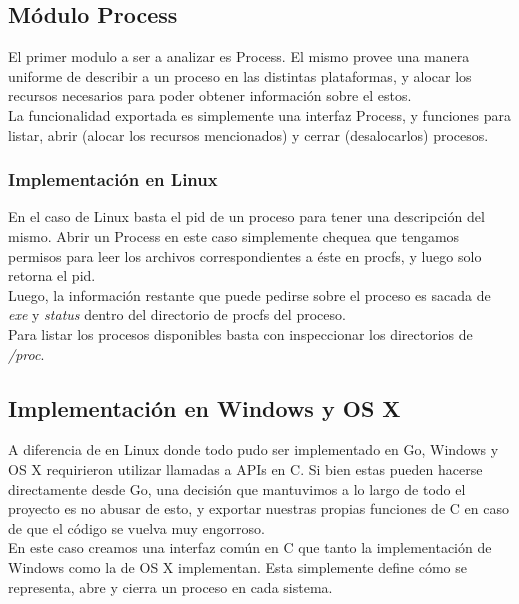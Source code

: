 \subsection{Módulo Process}

El primer modulo a ser a analizar es Process. El mismo provee una manera
uniforme de describir a un proceso en las distintas plataformas, y alocar los
recursos necesarios para poder obtener información sobre el estos.\\

La funcionalidad exportada es simplemente una interfaz Process, y funciones
para listar, abrir (alocar los recursos mencionados) y cerrar (desalocarlos)
procesos.\\

\subsubsection{Implementación en Linux}

En el caso de Linux basta el pid de un proceso para tener una descripción del
mismo. Abrir un Process en este caso simplemente chequea que tengamos permisos
para leer los archivos correspondientes a éste en procfs, y luego solo retorna
el pid.\\

Luego, la información restante que puede pedirse sobre el proceso es sacada de
\textit{exe} y \textit{status} dentro del directorio de procfs del proceso.\\

Para listar los procesos disponibles basta con inspeccionar los directorios de
\textit{/proc}.

\subsection{Implementación en Windows y OS X}

A diferencia de en Linux donde todo pudo ser implementado en Go, Windows y OS X
requirieron utilizar llamadas a APIs en C. Si bien estas pueden hacerse
directamente desde Go, una decisión que mantuvimos a lo largo de todo el
proyecto es no abusar de esto, y exportar nuestras propias funciones de C en
caso de que el código se vuelva muy engorroso.\\

En este caso creamos una interfaz común en C que tanto la implementación de
Windows como la de OS X implementan. Esta simplemente define cómo se representa,
abre y cierra un proceso en cada sistema.\\

